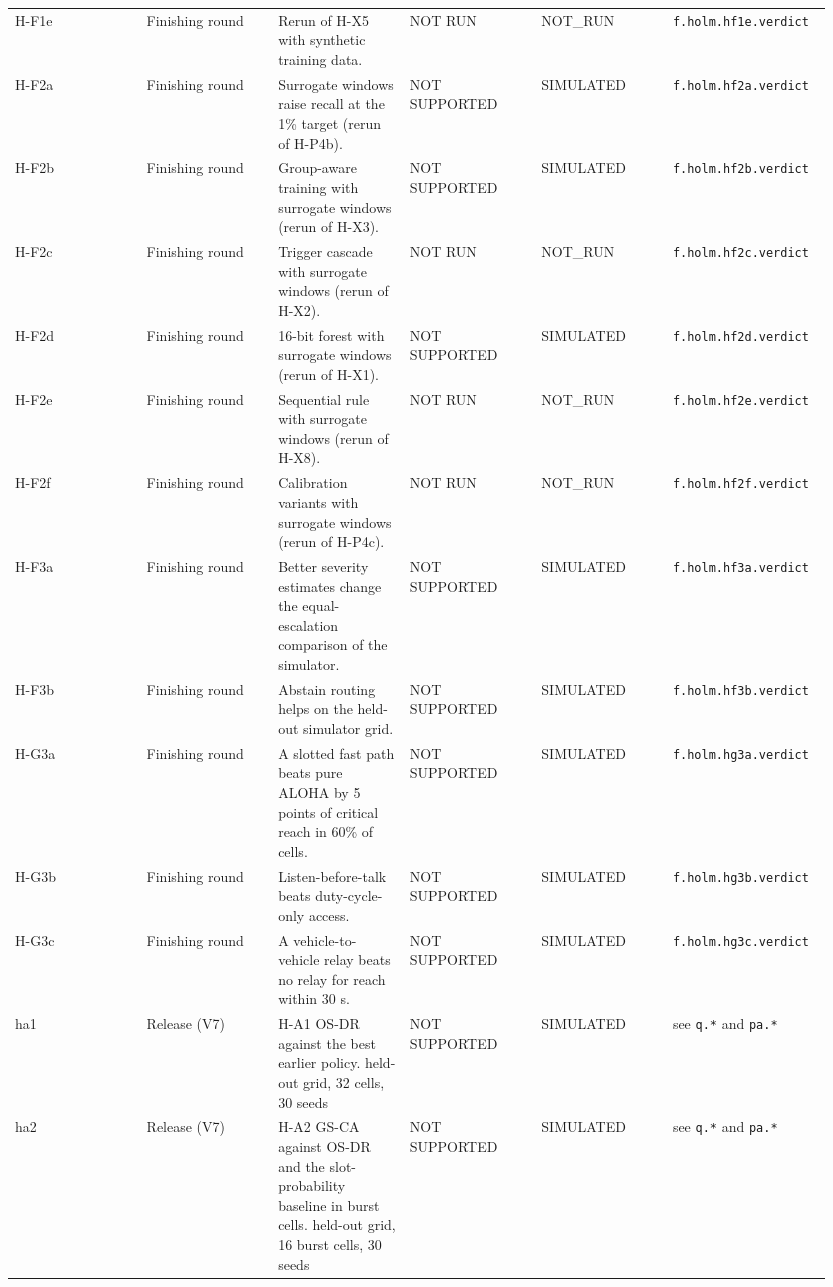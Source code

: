{\begin{longtable}{p{0.158\linewidth}p{0.158\linewidth}p{0.158\linewidth}p{0.158\linewidth}p{0.158\linewidth}p{0.158\linewidth}}
H-F1e & Finishing round & Rerun of H-X5 with synthetic training data. & NOT RUN & NOT\_RUN & \texttt{f.holm.hf1e.verdict} \\
H-F2a & Finishing round & Surrogate windows raise recall at the 1\% target (rerun of H-P4b). & NOT SUPPORTED & SIMULATED & \texttt{f.holm.hf2a.verdict} \\
H-F2b & Finishing round & Group-aware training with surrogate windows (rerun of H-X3). & NOT SUPPORTED & SIMULATED & \texttt{f.holm.hf2b.verdict} \\
H-F2c & Finishing round & Trigger cascade with surrogate windows (rerun of H-X2). & NOT RUN & NOT\_RUN & \texttt{f.holm.hf2c.verdict} \\
H-F2d & Finishing round & 16-bit forest with surrogate windows (rerun of H-X1). & NOT SUPPORTED & SIMULATED & \texttt{f.holm.hf2d.verdict} \\
H-F2e & Finishing round & Sequential rule with surrogate windows (rerun of H-X8). & NOT RUN & NOT\_RUN & \texttt{f.holm.hf2e.verdict} \\
H-F2f & Finishing round & Calibration variants with surrogate windows (rerun of H-P4c). & NOT RUN & NOT\_RUN & \texttt{f.holm.hf2f.verdict} \\
H-F3a & Finishing round & Better severity estimates change the equal-escalation comparison of the simulator. & NOT SUPPORTED & SIMULATED & \texttt{f.holm.hf3a.verdict} \\
H-F3b & Finishing round & Abstain routing helps on the held-out simulator grid. & NOT SUPPORTED & SIMULATED & \texttt{f.holm.hf3b.verdict} \\
H-G3a & Finishing round & A slotted fast path beats pure ALOHA by 5 points of critical reach in 60\% of cells. & NOT SUPPORTED & SIMULATED & \texttt{f.holm.hg3a.verdict} \\
H-G3b & Finishing round & Listen-before-talk beats duty-cycle-only access. & NOT SUPPORTED & SIMULATED & \texttt{f.holm.hg3b.verdict} \\
H-G3c & Finishing round & A vehicle-to-vehicle relay beats no relay for reach within 30 s. & NOT SUPPORTED & SIMULATED & \texttt{f.holm.hg3c.verdict} \\
ha1 & Release (V7) & H-A1 OS-DR against the best earlier policy. held-out grid, 32 cells, 30 seeds & NOT SUPPORTED & SIMULATED & see \texttt{q.*} and \texttt{pa.*} \\
ha2 & Release (V7) & H-A2 GS-CA against OS-DR and the slot-probability baseline in burst cells. held-out grid, 16 burst cells, 30 seeds & NOT SUPPORTED & SIMULATED & see \texttt{q.*} and \texttt{pa.*} \\

\end{longtable}}
